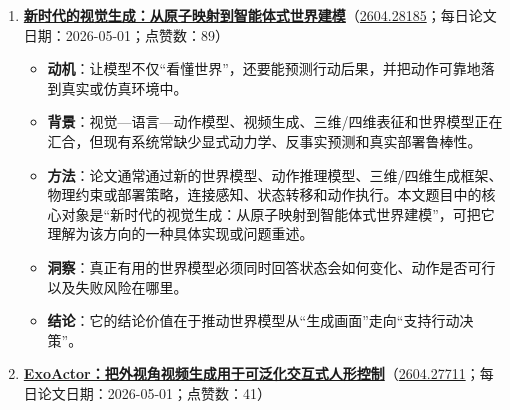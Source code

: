 \begin{enumerate}[leftmargin=1.5em]
  \begin{itemize}[leftmargin=1.5em]
    \item \textbf{动机}：让模型不仅“看懂世界”，还要能预测行动后果，并把动作可靠地落到真实或仿真环境中。
    \item \textbf{背景}：视觉—语言—动作模型、视频生成、三维/四维表征和世界模型正在汇合，但现有系统常缺少显式动力学、反事实预测和真实部署鲁棒性。
    \item \textbf{方法}：论文通常通过新的世界模型、动作推理模型、三维/四维生成框架、物理约束或部署策略，连接感知、状态转移和动作执行。本文题目中的核心对象是“Map2World：由分割图约束的文本到 3D 世界生成”，可把它理解为该方向的一种具体实现或问题重述。
    \item \textbf{洞察}：真正有用的世界模型必须同时回答状态会如何变化、动作是否可行以及失败风险在哪里。
    \item \textbf{结论}：它的结论价值在于推动世界模型从“生成画面”走向“支持行动决策”。
  \end{itemize}
  \item \textbf{\href{https://huggingface.co/papers/2604.28185}{新时代的视觉生成：从原子映射到智能体式世界建模}}（\href{https://arxiv.org/abs/2604.28185}{2604.28185}；每日论文日期：2026-05-01；点赞数：89）
  \begin{itemize}[leftmargin=1.5em]
    \item \textbf{动机}：让模型不仅“看懂世界”，还要能预测行动后果，并把动作可靠地落到真实或仿真环境中。
    \item \textbf{背景}：视觉—语言—动作模型、视频生成、三维/四维表征和世界模型正在汇合，但现有系统常缺少显式动力学、反事实预测和真实部署鲁棒性。
    \item \textbf{方法}：论文通常通过新的世界模型、动作推理模型、三维/四维生成框架、物理约束或部署策略，连接感知、状态转移和动作执行。本文题目中的核心对象是“新时代的视觉生成：从原子映射到智能体式世界建模”，可把它理解为该方向的一种具体实现或问题重述。
    \item \textbf{洞察}：真正有用的世界模型必须同时回答状态会如何变化、动作是否可行以及失败风险在哪里。
    \item \textbf{结论}：它的结论价值在于推动世界模型从“生成画面”走向“支持行动决策”。
  \end{itemize}
  \item \textbf{\href{https://huggingface.co/papers/2604.27711}{ExoActor：把外视角视频生成用于可泛化交互式人形控制}}（\href{https://arxiv.org/abs/2604.27711}{2604.27711}；每日论文日期：2026-05-01；点赞数：41）
  \begin{itemize}[leftmargin=1.5em]

\end{itemize}
\end{enumerate}

